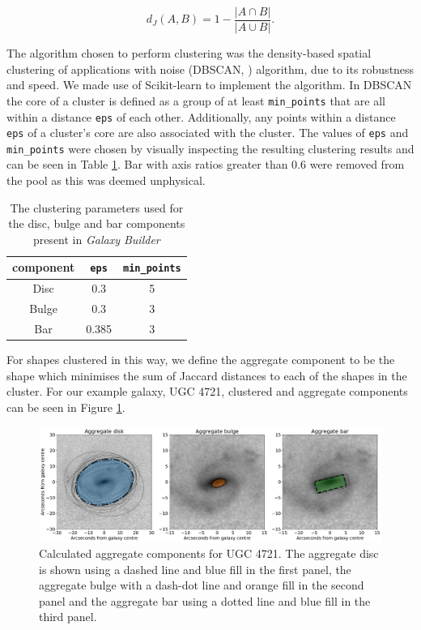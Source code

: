 \documentclass[../main.tex]{subfiles}
\begin{document}
\begin{equation}
d_J(A, B) = 1 - \frac{|A \cap B|}{|A \cup B|}.
\end{equation}

The algorithm chosen to perform clustering was the density-based spatial clustering of applications with noise (DBSCAN, \citealt{dbscan}) algorithm, due to its robustness and speed. We made use of Scikit-learn \citep{scikit-learn} to implement the algorithm. In DBSCAN the core of a cluster is defined as a group of at least \texttt{min\_points} that are all within a distance \texttt{eps} of each other. Additionally, any points within a distance \texttt{eps} of a cluster's core are also associated with the cluster. The values of \texttt{eps} and \texttt{min\_points} were chosen by visually inspecting the resulting clustering results and can be seen in Table \ref{table:dbscan_params}.  Bar with axis ratios greater than 0.6 were removed from the pool as this was deemed unphysical.

\begin{table}
  \centering
  \caption{The clustering parameters used for the disc, bulge and bar components present in \textit{Galaxy Builder}}
  \begin{tabular}{ |c|c|c| }
    \hline
    component & \texttt{eps} & \texttt{min\_points} \\
    \hline
    Disc & 0.3 & 5 \\
    Bulge & 0.3 & 3 \\
    Bar & 0.385 & 3 \\
    \hline
  \end{tabular}
  \label{table:dbscan_params}
\end{table}

For shapes clustered in this way, we define the aggregate component to be the shape which minimises the sum of Jaccard distances to each of the shapes in the cluster. For our example galaxy, UGC 4721, clustered and aggregate components can be seen in Figure \ref{fig:mean_shapes}.

\begin{figure}
  \includegraphics[width=17.3cm]{images__method/mean_shapes.pdf}
  \caption{Calculated aggregate components for UGC 4721. The aggregate disc is shown using a dashed line and blue fill in the first panel, the aggregate bulge with a dash-dot line and orange fill in the second panel and the aggregate bar using a dotted line and blue fill in the third panel.}
  \label{fig:mean_shapes}
\end{figure}
\end{document}
